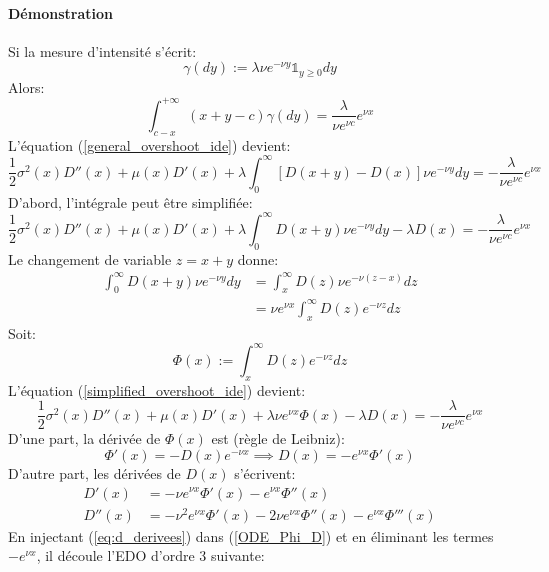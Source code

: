\paragraph{Démonstration}
Si la mesure d'intensité s'écrit:
\[
\gamma(dy):=\lambda\nu e^{-\nu y}\mathds{1}_{y\geq0}dy
\]
Alors:
\[
\int_{c-x}^{+\infty}(x+y-c)\gamma(dy)=\frac{\lambda}{\nu e^{\nu c}}e^{\nu x}
\]
L'équation (\ref{general_overshoot_ide}) devient:
\begin{equation}\label{initial_overshoot_ide}
    \frac{1}{2}\sigma^2(x)D''(x)+\mu(x)D'(x)+\lambda\int_0^\infty[D(x+y)-D(x)]\nu e^{-\nu y}dy=-\frac{\lambda}{\nu e^{\nu c}}e^{\nu x}
\end{equation}
D'abord, l'intégrale peut être simplifiée: 
\begin{equation}\label{simplified_overshoot_ide}
    \frac{1}{2}\sigma^2(x)D''(x)+\mu(x)D'(x)+\lambda\int_0^\infty D(x+y)\nu e^{-\nu y}dy-\lambda D(x)=-\frac{\lambda}{\nu e^{\nu c}}e^{\nu x}
\end{equation}
Le changement de variable $z=x+y$ donne:
\[
\begin{aligned}
    \int_0^\infty D(x+y)\nu e^{-\nu y}dy&=\int_x^\infty D(z)\nu e^{-\nu(z-x)}dz\\
    &=\nu e^{\nu x}\int_x^\infty D(z)e^{-\nu z}dz
\end{aligned}
\]
Soit:
\[
\Phi(x):=\int_x^\infty D(z)e^{-\nu z}dz
\]
L'équation (\ref{simplified_overshoot_ide}) devient:
\begin{equation}\label{ODE_Phi_D}
    \frac{1}{2}\sigma^2(x)D''(x)+\mu(x)D'(x)+\lambda\nu e^{\nu x}\Phi(x)-\lambda D(x)=-\frac{\lambda}{\nu e^{\nu c}}e^{\nu x}
\end{equation}
D'une part, la dérivée de $\Phi(x)$ est (règle de Leibniz):
\begin{equation}\label{Leibniz_rule}
    \Phi'(x)=-D(x)e^{-\nu x}\implies D(x)=-e^{\nu x }\Phi'(x)
\end{equation}
D'autre part, les dérivées de $D(x)$ s'écrivent: 
\begin{equation}\label{eq:d_derivees}
    \begin{aligned}
        D'(x) &= -\nu e^{\nu x}\Phi'(x)-e^{\nu x}\Phi''(x) \\
        D''(x)&= -\nu^2e^{\nu x}\Phi'(x)-2\nu e^{\nu x}\Phi''(x)-e^{\nu x}\Phi'''(x)
    \end{aligned}
\end{equation}
En injectant (\ref{eq:d_derivees}) dans (\ref{ODE_Phi_D}) et en éliminant les termes $-e^{\nu x}$, il découle l'\acs{EDO} d'ordre 3 suivante: 
